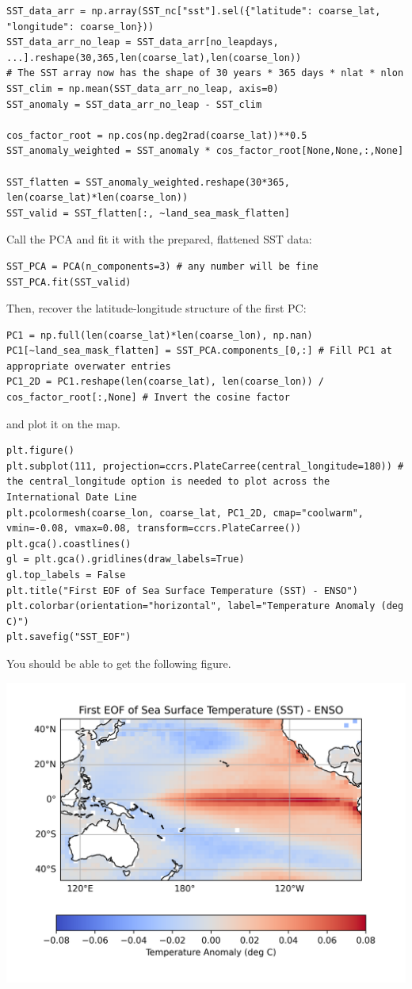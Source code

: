 \begin{lstlisting}
SST_data_arr = np.array(SST_nc["sst"].sel({"latitude": coarse_lat, "longitude": coarse_lon}))
SST_data_arr_no_leap = SST_data_arr[no_leapdays, ...].reshape(30,365,len(coarse_lat),len(coarse_lon))
# The SST array now has the shape of 30 years * 365 days * nlat * nlon
SST_clim = np.mean(SST_data_arr_no_leap, axis=0)
SST_anomaly = SST_data_arr_no_leap - SST_clim

cos_factor_root = np.cos(np.deg2rad(coarse_lat))**0.5
SST_anomaly_weighted = SST_anomaly * cos_factor_root[None,None,:,None]

SST_flatten = SST_anomaly_weighted.reshape(30*365, len(coarse_lat)*len(coarse_lon))
SST_valid = SST_flatten[:, ~land_sea_mask_flatten]
\end{lstlisting}
Call the PCA and fit it with the prepared, flattened SST data:
\begin{lstlisting}
SST_PCA = PCA(n_components=3) # any number will be fine
SST_PCA.fit(SST_valid)
\end{lstlisting}
Then, recover the latitude-longitude structure of the first PC:
\begin{lstlisting}
PC1 = np.full(len(coarse_lat)*len(coarse_lon), np.nan)
PC1[~land_sea_mask_flatten] = SST_PCA.components_[0,:] # Fill PC1 at appropriate overwater entries
PC1_2D = PC1.reshape(len(coarse_lat), len(coarse_lon)) / cos_factor_root[:,None] # Invert the cosine factor
\end{lstlisting}
and plot it on the map.
\begin{lstlisting}
plt.figure()
plt.subplot(111, projection=ccrs.PlateCarree(central_longitude=180)) # the central_longitude option is needed to plot across the International Date Line
plt.pcolormesh(coarse_lon, coarse_lat, PC1_2D, cmap="coolwarm", vmin=-0.08, vmax=0.08, transform=ccrs.PlateCarree())
plt.gca().coastlines()
gl = plt.gca().gridlines(draw_labels=True)
gl.top_labels = False
plt.title("First EOF of Sea Surface Temperature (SST) - ENSO")
plt.colorbar(orientation="horizontal", label="Temperature Anomaly (deg C)")
plt.savefig("SST_EOF")
\end{lstlisting}
You should be able to get the following figure.
\begin{center}
\includegraphics[scale=0.75]{graphics/SST_EOF.png}
\end{center}
